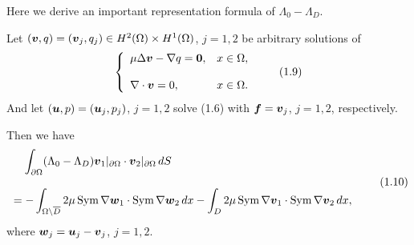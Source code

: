 Here we derive an important representation formula of $\Lambda_0-\Lambda_D$.








Let $(\mbox{\boldmath $v$},q)=(\mbox{\boldmath $v$}_j,q_j)\in H^2(\Omega)\times H^1(\Omega)$, $j=1,2$ be arbitrary  solutions of
$$\left\{
 \begin{array}{ll}
 \mu\Delta\mbox{\boldmath $v$}-\nabla q=\mbox{\boldmath $0$}, & x\in\Omega,
 \\
 \\
 \displaystyle
 \nabla\cdot\mbox{\boldmath $v$}=0, & x\in\Omega.
 \end{array}
 \right.
 \tag {1.9}
 $$
And  let $(\mbox{\boldmath $u$},p)=(\mbox{\boldmath $u$}_j,p_j)$, $j=1,2$ solve (1.6) with $\mbox{\boldmath $f$}=\mbox{\boldmath $v$}_j$, $j=1,2$, respectively.

\noindent
Then we have
$$\begin{array}{l}
\displaystyle
\,\,\,\,\,\,
\int_{\partial\Omega}(\Lambda_0-\Lambda_D)\mbox{\boldmath $v$}_1
\vert_{\partial\Omega}\cdot\mbox{\boldmath $v$}_2\vert_{\partial\Omega}\,dS
\\
\\
\displaystyle
=-\int_{\Omega\setminus\overline{D}}2\mu\,
\text{Sym}\,\nabla\mbox{\boldmath $w$}_1\cdot
\text{Sym}\,\nabla\mbox{\boldmath $w$}_2\,dx
-\int_{D}2\mu\,
\text{Sym}\,\nabla\mbox{\boldmath $v$}_1\cdot
\text{Sym}\,\nabla\mbox{\boldmath $v$}_2\,dx,
\end{array}
\tag {1.10}
$$
where $\mbox{\boldmath $w$}_j=\mbox{\boldmath $u$}_j-\mbox{\boldmath $v$}_j$, $j=1,2$.

\endproclaim


